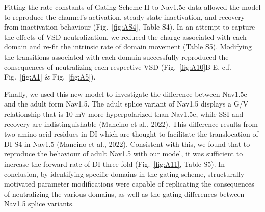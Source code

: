 Fitting the rate constants of Gating Scheme II to Nav1.5e data allowed the model to reproduce the channel’s activation, steady-state inactivation, and recovery from inactivation behaviour (Fig.~\ref{fig:AS4}, Table S4). In an attempt to capture the effects of VSD neutralization, we reduced the charge associated with each domain and re-fit the intrinsic rate of domain movement (Table S5). Modifying the transitions associated with each domain successfully reproduced the consequences of neutralizing each respective VSD (Fig.~\ref{fig:A10}B-E, c.f. Fig.~\ref{fig:A1} \& Fig.~\ref{fig:A5}).

Finally, we used this new model to investigate the difference between Nav1.5e and the adult form Nav1.5. The adult splice variant of Nav1.5 displays a G/V relationship that is 10 mV more hyperpolarized than Nav1.5e, while SSI and recovery are indistinguishable (Mancino et al., 2022). This difference results from two amino acid residues in DI which are thought to facilitate the translocation of DI-S4 in Nav1.5 (Mancino et al., 2022). Consistent with this, we found that to reproduce the behaviour of adult Nav1.5 with our model, it was sufficient to increase the forward rate of DI three-fold (Fig.~\ref{fig:A11}, Table S5). In conclusion, by identifying specific domains in the gating scheme, structurally-motivated parameter modifications were capable of replicating the consequences of neutralizing the various domains, as well as the gating differences between Nav1.5 splice variants.

